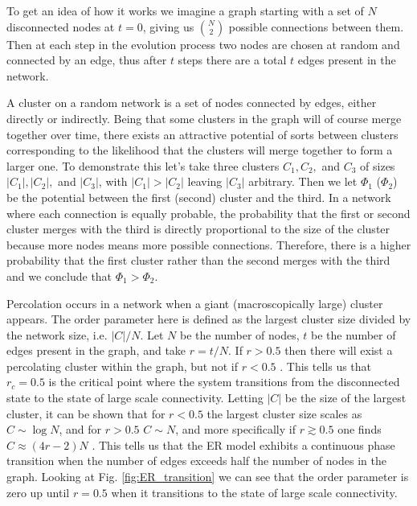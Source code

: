 To get an idea of how it works we imagine a graph starting with a set of $N$ disconnected nodes at $t = 0$, giving us ${N \choose 2}$ possible connections between them.
Then at each step in the evolution process two nodes are chosen at random and connected by an edge, thus after $t$ steps there are a total $t$ edges present in the network.

A cluster on a random network is a set of nodes connected by edges, either directly or indirectly.
Being that some clusters in the graph will of course merge together over time, there exists an attractive potential of sorts between clusters corresponding to the likelihood that the clusters will merge together to form a larger one.
To demonstrate this let's take three clusters $C_1, C_2,$ and $C_3$ of sizes $|C_1|, |C_2|,$ and $|C_3|$, with $|C_1| > |C_2|$ leaving $|C_3|$ arbitrary.
Then we let $\Phi_1$ ($\Phi_2$) be the potential between the first (second) cluster and the third.
In a network where each connection is equally probable, the probability that the first or second cluster merges with the third is directly proportional to the size of the cluster because more nodes means more possible connections.
Therefore, there is a higher probability that the first cluster rather than the second merges with the third and we conclude that $\Phi_1 > \Phi_2$.

Percolation occurs in a network when a giant (macroscopically large) cluster appears.
The order parameter here is defined as the largest cluster size divided by the network size, i.e. $|C| / N$.
Let $N$ be the number of nodes, $t$ be the number of edges present in the graph, and take $r = t/N$.
If $r > 0.5$ then there will exist a percolating cluster within the graph, but not if $r < 0.5$ \cite{ER_2}. This tells us that $r_c = 0.5$ is the critical point where the system transitions from the disconnected state to the state of large scale connectivity.
Letting $|C|$ be the size of the largest cluster, it can be shown that for $r < 0.5$ the largest cluster size scales as $C \sim \log N$, and for $r > 0.5$ $C \sim N$, and more specifically if $r \gtrsim 0.5$ one finds $C \approx (4r - 2)N$ \cite{ER_2}.
This tells us that the ER model exhibits a continuous phase transition when the number of edges exceeds half the number of nodes in the graph.
Looking at Fig. \ref{fig:ER_transition} we can see that the order parameter is zero up until $r = 0.5$ when it transitions to the state of large scale connectivity.


